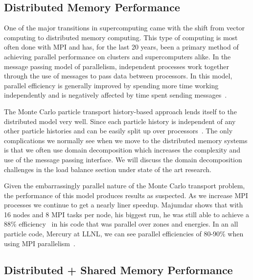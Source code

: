 \subsection*{ \textbf{Distributed Memory Performance}}

One of the major transitions in supercomputing came with the shift from vector computing to distributed memory computing.
%
This type of computing is most often done with MPI and has, for the last 20 years, been a primary method of achieving parallel performance on clusters and supercomputers alike.
%
In the message passing model of parallelism, independent processes work together through the use of messages to pass data between processors.
%
In this model, parallel efficiency is generally improved by spending more time working independently and is negatively affected by time spent sending messages~\cite{yanghybrid}.
%

%
The Monte Carlo particle transport history-based approach lends itself to the distributed model very well.
%
Since each particle history is independent of any other particle histories and can be easily split up over processors~\cite{yanghybrid}.
%
The only complications we normally see when we move to the distributed memory systems is that we often use domain decomposition which increases the complexity and use of the message passing interface.
%
We will discuss the domain decomposition challenges in the load balance section under state of the art research.
%

%
Given the embarrassingly parallel nature of the Monte Carlo transport problem, the performance of this model produces results as suspected.
%
As we increase MPI processes we continue to get a nearly liner speedup.
%
Majumdar shows that with 16 nodes and 8 MPI tasks per node, his biggest run, he was still able to achieve a 88\% efficiency~\cite{majumdar2000parallel} in his code that was parallel over zones and energies.
%
In an all particle code, Mercury at LLNL, we can see parallel efficiencies of 80-90\% when using MPI parallelism~\cite{procassini2005load}.

\subsection*{ \textbf{Distributed + Shared Memory Performance}}


